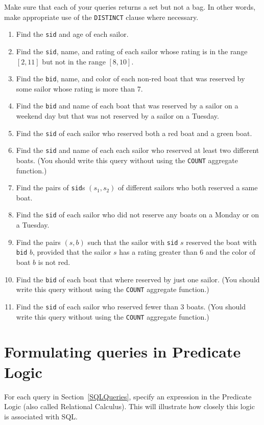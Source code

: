 Make sure that each of your queries returns a set but not a bag.  In other words, make appropriate use of the
{\tt DISTINCT} clause where necessary.
\begin{enumerate}
\item Find the {\tt sid} and {age} of each sailor.
\item Find the {\tt sid}, name, and rating of each sailor whose rating is in the range $[2,11]$  but not in the range $[8,10]$.   
\item Find the {\tt bid}, name, and color of each non-red boat that was                                          
reserved by some sailor whose rating is more than 7.  
\item Find the {\tt bid} and name of each boat that was reserved by a sailor on                                  
a weekend day but that was not reserved by a sailor on a Tuesday. 
\item Find the {\tt sid} of each sailor who reserved both a red boat and a green boat.
\item Find the {\tt sid} and name of each each sailor who reserved at least two different boats.
(You should write this query without using the {\tt COUNT} aggregate function.)
\item Find the pairs of {\tt sid}s $(s_1,s_2)$ of different sailors who both reserved a same boat.
\item Find the {\tt sid} of each sailor who did not reserve any boats on a Monday or on a Tuesday.
\item Find the pairs $(s, b)$ such that the sailor with {\tt sid} $s$ reserved the boat with {\tt bid} $b$, provided
that the sailor $s$ has a rating greater than $6$ and the color of boat $b$ is  not red.
\item Find the {\tt bid} of each boat that where reserved by just one sailor.  (You should write this query without using the {\tt COUNT} aggregate function.)
\item Find the {\tt sid} of each sailor who reserved fewer than 3 boats.
 (You should write this query without using the {\tt COUNT} aggregate function.)
\end{enumerate}


\section{Formulating queries in Predicate Logic}

For each query in Section~\ref{SQLQueries}, specify an expression in the Predicate Logic (also called Relational Calculus).
This will illustrate how closely this logic is associated with SQL.

